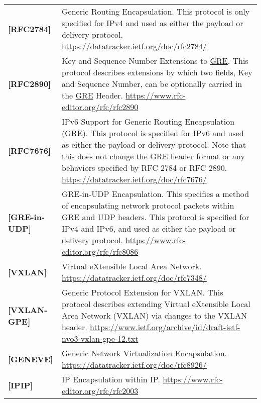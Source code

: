 \begin{longtable}{l p{5in}}
	\label{intro:rfc2784}\textbf{[RFC2784]} &
    Generic Routing Encapsulation. This protocol is only specified for IPv4 and used as either the payload or delivery protocol.
	\newline\url{https://datatracker.ietf.org/doc/rfc2784/}\\
	\label{intro:rfc2890}\textbf{[RFC2890]} &
    Key and Sequence Number Extensions to \hyperref[intro:rfc2784]{GRE}. This protocol describes extensions by which two fields, Key and
    Sequence Number, can be optionally carried in the \hyperref[intro:rfc2784]{GRE} Header.
	\newline\url{https://www.rfc-editor.org/rfc/rfc2890}\\
	\label{intro:rfc7676}\textbf{[RFC7676]} &
    IPv6 Support for Generic Routing Encapsulation (GRE). This protocol is specified for IPv6 and used as either the payload or
    delivery protocol. Note that this does not change the GRE header format or any behaviors specified by RFC 2784 or RFC 2890.
	\newline\url{https://datatracker.ietf.org/doc/rfc7676/}\\
	\label{intro:rfc8086}\textbf{[GRE-in-UDP]} &
    GRE-in-UDP Encapsulation. This specifies a method of encapsulating network protocol packets within GRE and UDP headers.
    This protocol is specified for IPv4 and IPv6, and used as either the payload or delivery protocol.
	\newline\url{https://www.rfc-editor.org/rfc/rfc8086}\\
	\label{intro:vxlan}\textbf{[VXLAN]} &
    Virtual eXtensible Local Area Network.
	\newline\url{https://datatracker.ietf.org/doc/rfc7348/}\\
	\label{intro:vxlan-gpe}\textbf{[VXLAN-GPE]} &
    Generic Protocol Extension for VXLAN. This protocol describes extending Virtual eXtensible Local Area Network (VXLAN) via changes to the VXLAN header.
	\newline\url{https://www.ietf.org/archive/id/draft-ietf-nvo3-vxlan-gpe-12.txt}\\
	\label{intro:geneve}\textbf{[GENEVE]} &
    Generic Network Virtualization Encapsulation.
	\newline\url{https://datatracker.ietf.org/doc/rfc8926/}\\
	\label{intro:ipip}\textbf{[IPIP]} &
    IP Encapsulation within IP.
	\newline\url{https://www.rfc-editor.org/rfc/rfc2003}\\

\end{longtable}
